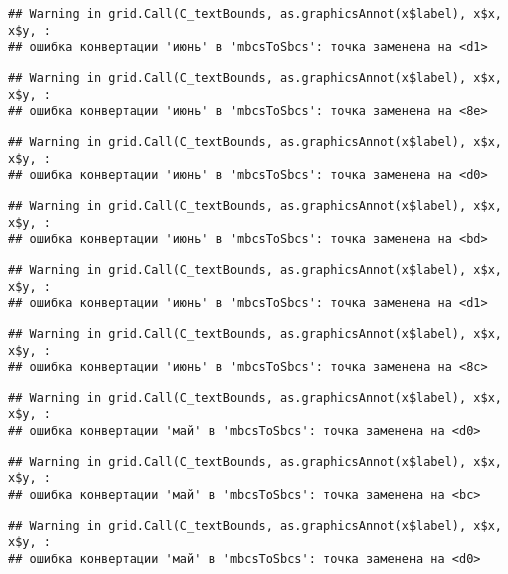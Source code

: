 \documentclass[
]{article}
\begin{document}
\begin{verbatim}
## Warning in grid.Call(C_textBounds, as.graphicsAnnot(x$label), x$x, x$y, :
## ошибка конвертации 'июнь' в 'mbcsToSbcs': точка заменена на <d1>
\end{verbatim}

\begin{verbatim}
## Warning in grid.Call(C_textBounds, as.graphicsAnnot(x$label), x$x, x$y, :
## ошибка конвертации 'июнь' в 'mbcsToSbcs': точка заменена на <8e>
\end{verbatim}

\begin{verbatim}
## Warning in grid.Call(C_textBounds, as.graphicsAnnot(x$label), x$x, x$y, :
## ошибка конвертации 'июнь' в 'mbcsToSbcs': точка заменена на <d0>
\end{verbatim}

\begin{verbatim}
## Warning in grid.Call(C_textBounds, as.graphicsAnnot(x$label), x$x, x$y, :
## ошибка конвертации 'июнь' в 'mbcsToSbcs': точка заменена на <bd>
\end{verbatim}

\begin{verbatim}
## Warning in grid.Call(C_textBounds, as.graphicsAnnot(x$label), x$x, x$y, :
## ошибка конвертации 'июнь' в 'mbcsToSbcs': точка заменена на <d1>
\end{verbatim}

\begin{verbatim}
## Warning in grid.Call(C_textBounds, as.graphicsAnnot(x$label), x$x, x$y, :
## ошибка конвертации 'июнь' в 'mbcsToSbcs': точка заменена на <8c>
\end{verbatim}

\begin{verbatim}
## Warning in grid.Call(C_textBounds, as.graphicsAnnot(x$label), x$x, x$y, :
## ошибка конвертации 'май' в 'mbcsToSbcs': точка заменена на <d0>
\end{verbatim}

\begin{verbatim}
## Warning in grid.Call(C_textBounds, as.graphicsAnnot(x$label), x$x, x$y, :
## ошибка конвертации 'май' в 'mbcsToSbcs': точка заменена на <bc>
\end{verbatim}

\begin{verbatim}
## Warning in grid.Call(C_textBounds, as.graphicsAnnot(x$label), x$x, x$y, :
## ошибка конвертации 'май' в 'mbcsToSbcs': точка заменена на <d0>
\end{verbatim}
\end{document}
